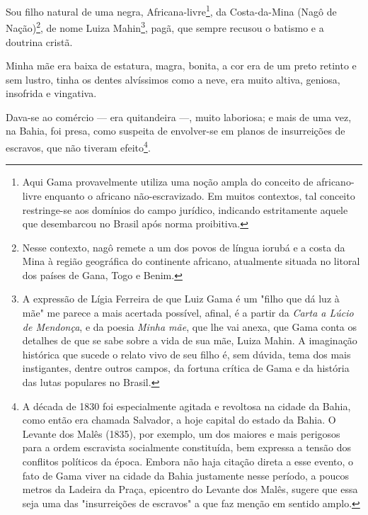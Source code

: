 Sou filho natural de uma negra, Africana-livre\footnote{Aqui Gama
  provavelmente utiliza uma noção ampla do conceito de africano-livre
  enquanto o africano não-escravizado. Em muitos contextos, tal conceito
  restringe-se aos domínios do campo jurídico, indicando estritamente
  aquele que desembarcou no Brasil após norma proibitiva.}, da
Costa-da-Mina (Nagô de Nação)\footnote{Nesse contexto, nagô remete a
  um dos povos de língua iorubá e a costa da Mina à região geográfica do
  continente africano, atualmente situada no litoral dos países de Gana,
  Togo e Benim.}, de nome Luiza Mahin\footnote{A expressão de Lígia
  Ferreira de que Luiz Gama é um "filho que dá luz à mãe" me parece a
  mais acertada possível, afinal, é a partir da \emph{Carta a Lúcio de
  Mendonça}, e da poesia \emph{Minha mãe}, que lhe vai anexa, que Gama
  conta os detalhes de que se sabe sobre a vida de sua mãe, Luiza Mahin.
  A imaginação histórica que sucede o relato vivo de seu filho é, sem
  dúvida, tema dos mais instigantes, dentre outros campos, da fortuna
  crítica de Gama e da história das lutas populares no Brasil.}, pagã,
que sempre recusou o batismo e a doutrina cristã.

Minha mãe era baixa de estatura, magra, bonita, a cor era de um preto
retinto e sem lustro, tinha os dentes alvíssimos como a neve, era muito
altiva, geniosa, insofrida e vingativa.

Dava-se ao comércio --- era quitandeira ---, muito laboriosa; e mais
de uma vez, na Bahia, foi presa, como suspeita de envolver-se em planos
de insurreições de escravos, que não tiveram efeito\footnote{A década
  de 1830 foi especialmente agitada e revoltosa na cidade da Bahia, como
  então era chamada Salvador, a hoje capital do estado da Bahia. O
  Levante dos Malês (1835), por exemplo, um dos maiores e mais perigosos
  para a ordem escravista socialmente constituída, bem expressa a tensão
  dos conflitos políticos da época. Embora não haja citação direta a
  esse evento, o fato de Gama viver na cidade da Bahia justamente nesse
  período, a poucos metros da Ladeira da Praça, epicentro do Levante dos
  Malês, sugere que essa seja uma das "insurreições de escravos" a que
  faz menção em sentido amplo.}.

